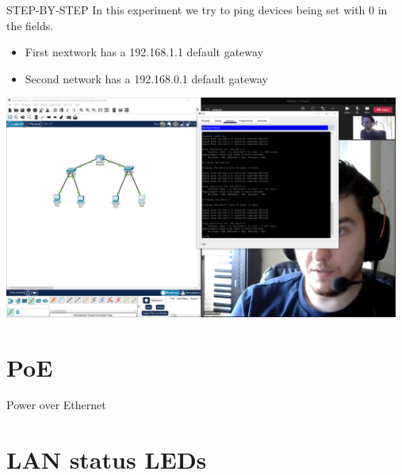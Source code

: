 \documentclass[a4paper,12pt]{article}
\begin{document}
STEP-BY-STEP
In this experiment we try to ping devices being set with 0 in the fields.

\begin{itemize}
\item{First nextwork has a 192.168.1.1 default gateway}
\item{Second network has a 192.168.0.1 default gateway}
\end{itemize}

\includegraphics[width=13cm]{./ping.PNG}

\section{PoE}
Power over Ethernet

\section{LAN status LEDs}



\clearpage
\printindex
\end{document}
